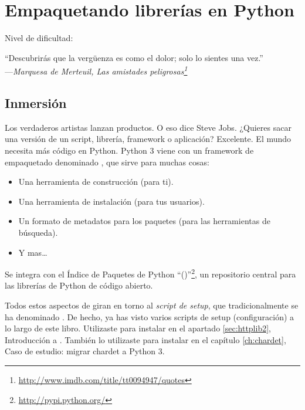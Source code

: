 
\chapter{Empaquetando librerías en Python}\label{ch:emplib}

\noindent Nivel de dificultad:\difllll

\begin{citaCap}
    ``Descubrirás que la vergüenza es como el dolor; solo lo sientes una vez.'' \\
        ---\emph{Marquesa de Merteuil, Las amistades peligrosas\footnote{\href{http://www.imdb.com/title/tt0094947/quotes}{http://www.imdb.com/title/tt0094947/quotes}}}
\end{citaCap}

\section{Inmersión}

Los verdaderos artistas lanzan productos. O eso dice Steve Jobs. ¿Quieres sacar una versión de un script, librería, framework o aplicación? Excelente. El mundo necesita más código en Python. Python 3 viene con un framework de empaquetado denominado , que sirve para muchas cosas:

\begin{itemize}
  \item Una herramienta de construcción (para ti).
  \item Una herramienta de instalación (para tus usuarios).
  \item Un formato de metadatos para los paquetes (para las herramientas de búsqueda).
  \item Y mas\ldots
\end{itemize}

Se integra con el Índice de Paquetes de Python ``()''\footnote{\href{http://pypi.python.org/}{http://pypi.python.org/}}, un repositorio central para las librerías de Python de código abierto.

Todos estos aspectos de  giran en torno al \emph{script de setup}, que tradicionalmente se ha denominado . De hecho, ya has visto varios scripts de setup (configuración) a lo largo de este libro. Utilizaste  para instalar  en el apartado \ref{sec:httplib2}, Introducción a . También lo utilizaste para instalar  en el capítulo \ref{ch:chardet}, Caso de estudio: migrar chardet a Python 3.

